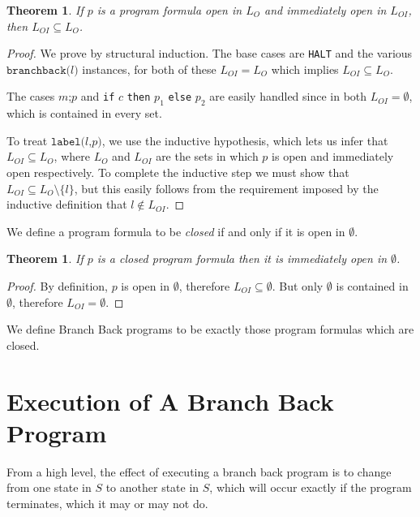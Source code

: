 \documentclass[11pt]{article}
\begin{document}
\newtheorem*{immedopencontainedinopen}{Theorem}
\begin{immedopencontainedinopen}
If $p$ is a program formula open in $L_{O}$ and immediately open in $L_{OI}$, then $L_{OI} \subseteq L_{O}$.
\end{immedopencontainedinopen}

\begin{proof}
We prove by structural induction.  The base cases are \texttt{HALT} and the various $\texttt{branchback(}l\texttt{)}$ instances, for both of these $L_{OI} = L_{O}$ which implies $L_{OI} \subseteq L_{O}$.

The cases $m\texttt{;}p$ and \texttt{if} $c$ \texttt{then} $p_{1}$ \texttt{else} $p_{2}$ are easily handled since in both $L_{OI} = \emptyset$, which is contained in every set.

To treat $\texttt{label(}l\texttt{,} p\texttt{)}$, we use the inductive hypothesis, which lets us infer that $L_{OI} \subseteq L_{O}$, where $L_{O}$ and $L_{OI}$ are the sets in which $p$ is open and immediately open respectively.  To complete the inductive step we must show that $L_{OI} \subseteq L_{O} \setminus \{l\}$, but this easily follows from the requirement imposed by the inductive definition that $l \notin L_{OI}$.
\end{proof}

We define a program formula to be \emph{closed} if and only if it is open in $\emptyset$.

\newtheorem*{closedimmedopeninempty}{Theorem}
\begin{closedimmedopeninempty}
If $p$ is a closed program formula then it is immediately open in $\emptyset$.
\end{closedimmedopeninempty}

\begin{proof}
By definition, $p$ is open in $\emptyset$, therefore $L_{OI} \subseteq \emptyset$.  But only $\emptyset$ is contained in $\emptyset$, therefore $L_{OI} = \emptyset$.
\end{proof}

We define Branch Back programs to be exactly those program formulas which are closed.

\section{Execution of A Branch Back Program}

From a high level, the effect of executing a branch back program is to change from one state in $S$ to another state in $S$, which will occur exactly if the program terminates, which it may or may not do.
\end{document}
